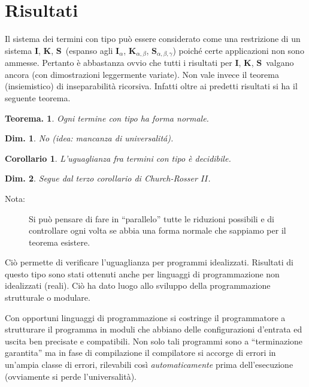 \documentclass{book}
\newtheorem{teorema}{Teorema.}[chapter]
\newtheorem{dimostrazione}{Dim.}[chapter]
\newtheorem{corollario}{Corollario}[chapter]
\newcommand*{\II}{$\mathbf{I}$}    %
\newcommand*{\KK}{$\mathbf{K}$}    %
\newcommand*{\SSS}{$\mathbf{S}$}   %
\newcommand*{\ii}{\mathbf{I}}    %
\newcommand*{\kk}{\mathbf{K}}    %
\newcommand*{\sss}{\mathbf{S}}   %
\begin{document}
\section{Risultati}
Il sistema dei termini con tipo pu\`o essere considerato come una restrizione
di un sistema \II, \KK, \SSS~(espanso agli $\ii_\alpha$, $\kk_{\alpha,\beta}$,
$\sss_{\alpha,\beta,\gamma}$) poich\'e certe applicazioni non sono ammesse.
Pertanto \`e abbastanza ovvio che tutti i risultati per \II, \KK, \SSS~valgano
ancora (con dimostrazioni leggermente variate). Non vale invece il teorema
(insiemistico) di inseparabilit\`a ricorsiva. Infatti oltre ai predetti
risultati si ha il seguente teorema.

\begin{teorema}
Ogni termine con tipo ha forma normale.
\end{teorema} 
\begin{dimostrazione}
No (idea: mancanza di universalit\'a).
\end{dimostrazione}

\begin{corollario}
L'uguaglianza fra termini con tipo \`e decidibile.
\end{corollario}
\begin{dimostrazione}
Segue dal terzo corollario di Church-Rosser $II$.
\end{dimostrazione}

\begin{description}
\item[Nota:]Si pu\`o pensare di fare in ``parallelo'' tutte le riduzioni
possibili e di controllare ogni volta se abbia una forma normale che sappiamo
per il teorema esistere.
\end{description}

Ci\`o permette di verificare l'uguaglianza per programmi idealizzati. Risultati
di questo tipo sono stati ottenuti anche per linguaggi di programmazione
non idealizzati (reali). Ci\`o ha dato luogo allo sviluppo della programmazione
strutturale o modulare. 

Con opportuni linguaggi di programmazione si
costringe il programmatore a strutturare il programma in moduli che abbiano 
delle configurazioni d'entrata ed uscita ben precisate e compatibili. Non solo
tali programmi sono a ``terminazione garantita'' ma in fase di compilazione il
compilatore si accorge di errori in un'ampia classe di errori, rilevabili 
cos\`i \emph{automaticamente} prima dell'esecuzione (ovviamente si perde
l'universalit\`a).
\end{document}

